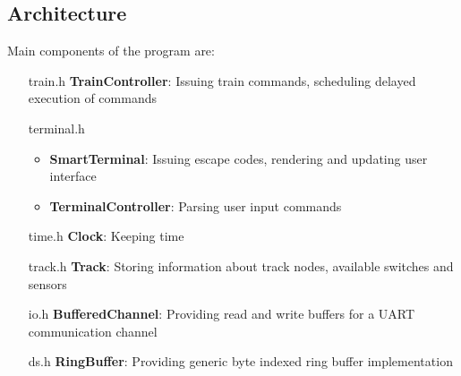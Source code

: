 \documentclass[11pt]{article}
\begin{document}
\subsection{Architecture}
Main components of the program are:
\begin{enumerate}
	\item [train.h] \textbf{TrainController}: Issuing train commands, scheduling delayed execution of commands
	\item [terminal.h] \begin{itemize}
		\item \textbf{SmartTerminal}: Issuing escape codes, rendering and updating user interface
		\item \textbf{TerminalController}: Parsing user input commands 
	\end{itemize}
	\item [time.h] \textbf{Clock}: Keeping time
	\item [track.h] \textbf{Track}: Storing information about track nodes, available switches and sensors
	\item [io.h] \textbf{BufferedChannel}: Providing read and write buffers for a UART communication channel 
	\item [ds.h] \textbf{RingBuffer}: Providing generic byte indexed ring buffer implementation
\end{enumerate}
\end{document}
